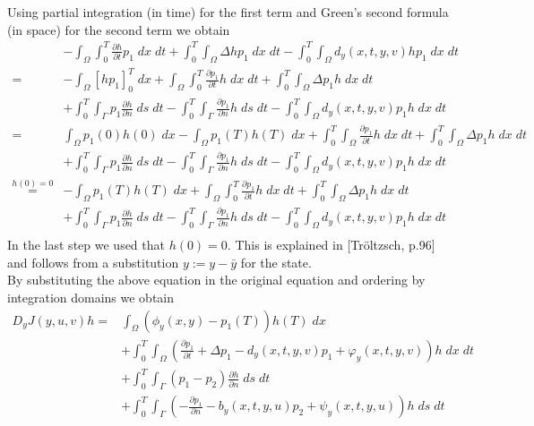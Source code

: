 \documentclass[
12pt, %
a4paper, %
onecolumn, %
portrait %
]{article}
\begin{document}
Using partial integration (in time) for the first term and Green's second formula (in space) for the second term we obtain
\begin{align*}
&- \int_{\Omega} \int_{0}^{T} \frac{\partial h}{\partial t} p_1 \; dx \; dt + \int_{0}^{T} \int_{\Omega} \Delta h p_1 \; dx \; dt - \int_{0}^{T} \int_{\Omega} d_y(x,t,y,v) h p_1 \; dx \; dt\\
= &- \int_{\Omega} \left[h p_1 \right]_0^T \; dx + \int_{\Omega} \int_{0}^{T}   \frac{\partial p_1}{\partial t} h \; dx \; dt + \int_{0}^{T} \int_{\Omega} \Delta p_1 h \; dx \; dt \\ 
&+ \int_{0}^{T} \int_{\Gamma}
p_1 \frac{\partial h}{\partial n} \; ds \; dt - \int_{0}^{T} \int_{\Gamma}
\frac{\partial p_1}{\partial n} h \; ds \; dt
 - \int_{0}^{T} \int_{\Omega} d_y(x,t,y,v) p_1 h \; dx \; dt \\
= &\int_{\Omega} p_1(0) h(0) \; dx - \int_{\Omega} p_1(T) h(T) \; dx +  \int_{0}^{T} \int_{\Omega} \frac{\partial p_1}{\partial t} h \; dx \; dt + \int_{0}^{T} \int_{\Omega} \Delta p_1 h \; dx \; dt \\ 
&+ \int_{0}^{T} \int_{\Gamma}
p_1 \frac{\partial h}{\partial n} \; ds \; dt - \int_{0}^{T} \int_{\Gamma}
\frac{\partial p_1}{\partial n} h \; ds \; dt
 - \int_{0}^{T} \int_{\Omega} d_y(x,t,y,v) p_1 h \; dx \; dt \\
 \overset{h(0)=0}{=} & - \int_{\Omega} p_1(T) h(T) \; dx + \int_{\Omega} \int_{0}^{T}   \frac{\partial p_1}{\partial t} h \; dx \; dt + \int_{0}^{T} \int_{\Omega} \Delta p_1 h \; dx \; dt \\ 
&+ \int_{0}^{T} \int_{\Gamma}
p_1 \frac{\partial h}{\partial n} \; ds \; dt - \int_{0}^{T} \int_{\Gamma} \frac{\partial p_1}{\partial n} h \; ds \; dt
 - \int_{0}^{T} \int_{\Omega} d_y(x,t,y,v) p_1 h \; dx \; dt \\
\end{align*}
In the last step we used that $h(0) = 0$. This is explained in [Tr\"oltzsch, p.96] and follows from a substitution $y := y - \bar{y}$ for the state.\\
By substituting the above equation in the original equation and ordering by integration domains we obtain
\begin{align*}
D_y J(y,u,v) h = & \int_{\Omega} (\phi_y(x,y) - p_1(T)) h(T) \; dx \\
& + \int_{0}^{T} \int_{\Omega} (\frac{\partial p_1}{\partial t} + \Delta p_1 - d_y(x,t,y,v) p_1 + \varphi_y(x,t,y, v)) h \; dx \; dt  \\
& + \int_{0}^{T} \int_{\Gamma} (p_1 - p_2) \frac{\partial h}{\partial n} \; ds \; dt \\
& + \int_{0}^{T} \int_{\Gamma} (- \frac{\partial p_1}{\partial n} - b_y(x,t,y,u) p_2 + \psi_y(x,t,y, u))  h \; ds \; dt
\end{align*}
\end{document}

